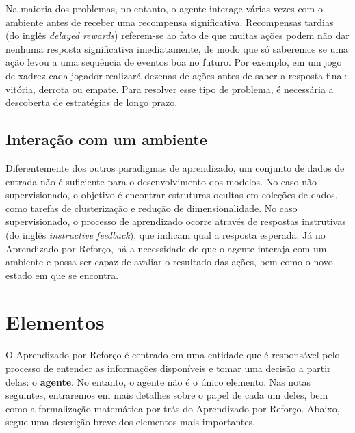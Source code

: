 \documentclass{article}
\begin{document}
                Na maioria dos problemas, no entanto, o agente interage várias vezes com o ambiente antes de receber uma recompensa significativa. Recompensas tardias (do inglês \emph{delayed rewards}) referem-se ao fato de que muitas ações podem não dar nenhuma resposta significativa imediatamente, de modo que só saberemos se uma ação levou a uma sequência de eventos boa no futuro. Por exemplo, em um jogo de xadrez cada jogador realizará dezenas de ações antes de saber a resposta final: vitória, derrota ou empate. Para resolver esse tipo de problema, é necessária a descoberta de estratégias de longo prazo.
        
        \subsection{Interação com um ambiente}
    
            Diferentemente dos outros paradigmas de aprendizado, um conjunto de dados de entrada não é suficiente para o desenvolvimento dos modelos. No caso não-supervisionado, o objetivo é encontrar estruturas ocultas em coleções de dados, como tarefas de clusterização e redução de dimensionalidade. No caso supervisionado, o processo de aprendizado ocorre através de respostas instrutivas (do inglês \emph{instructive feedback}), que indicam qual a resposta esperada. Já no Aprendizado por Reforço, há a necessidade de que o agente interaja com um ambiente e possa ser capaz de avaliar o resultado das ações, bem como o novo estado em que se encontra. 
            
    \section{Elementos}
    
        O Aprendizado por Reforço é centrado em uma entidade que é responsável pelo processo de entender as informações disponíveis e tomar uma decisão a partir delas: o \textbf{agente}. No entanto, o agente não é o único elemento. Nas notas seguintes, entraremos em mais detalhes sobre o papel de cada um deles, bem como a formalização matemática por trás do Aprendizado por Reforço. Abaixo, segue uma descrição breve dos elementos mais importantes.
    
\end{document}
